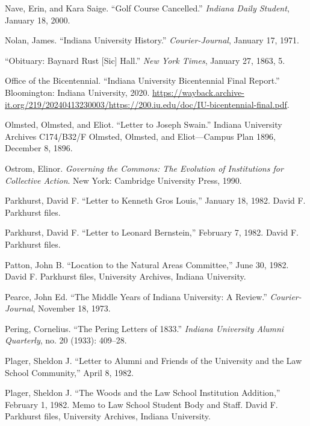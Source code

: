 \documentclass[
  american,
  letterpaper,
]{scrreprt}
\newlength{\cslhangindent}
\newenvironment{CSLReferences}[2] %
 {\begin{list}{}{%
  \setlength{\itemindent}{0pt}
  \setlength{\leftmargin}{0pt}
  \setlength{\parsep}{0pt}
  \ifodd #1
   \setlength{\leftmargin}{\cslhangindent}
   \setlength{\itemindent}{-1\cslhangindent}
  \fi
  \setlength{\itemsep}{#2\baselineskip}}}
 {\end{list}}
\begin{document}
\begin{CSLReferences}{1}{0}
Nave, Erin, and Kara Saige. {``Golf Course Cancelled.''} \emph{Indiana
Daily Student}, January 18, 2000.

Nolan, James. {``Indiana University History.''} \emph{Courier-Journal},
January 17, 1971.

{``Obituary: Baynard Rust {[}Sic{]} Hall.''} \emph{New York Times},
January 27, 1863, 5.

Office of the Bicentennial. {``Indiana University Bicentennial Final
Report.''} Bloomington: Indiana University, 2020.
\url{https://wayback.archive-it.org/219/20240413230003/https://200.iu.edu/doc/IU-bicentennial-final.pdf}.

Olmsted, Olmsted, and Eliot. {``Letter to Joseph Swain.''} {Indiana
University Archives C174/B32/F Olmsted, Olmsted, and Eliot---Campus Plan
1896}, December 8, 1896.

Ostrom, Elinor. \emph{Governing the Commons: The Evolution of
Institutions for Collective Action}. New York: Cambridge University
Press, 1990.

Parkhurst, David F. {``Letter to Kenneth Gros Louis,''} January 18,
1982. David F. Parkhurst files.

Parkhurst, David F. {``Letter to Leonard Bernstein,''} February 7, 1982.
David F. Parkhurst files.

Patton, John B. {``Location to the Natural Areas Committee,''} June 30,
1982. David F. Parkhurst files, University Archives, Indiana University.

Pearce, John Ed. {``The Middle Years of Indiana University: A Review.''}
\emph{Courier-Journal}, November 18, 1973.

Pering, Cornelius. {``The Pering Letters of 1833.''} \emph{Indiana
University Alumni Quarterly}, no. 20 (1933): 409--28.

Plager, Sheldon J. {``Letter to Alumni and Friends of the University and
the Law School Community,''} April 8, 1982.

Plager, Sheldon J. {``The Woods and the Law School Institution
Addition,''} February 1, 1982. Memo to Law School Student Body and
Staff. David F. Parkhurst files, University Archives, Indiana
University.


\end{CSLReferences}
\end{document}
